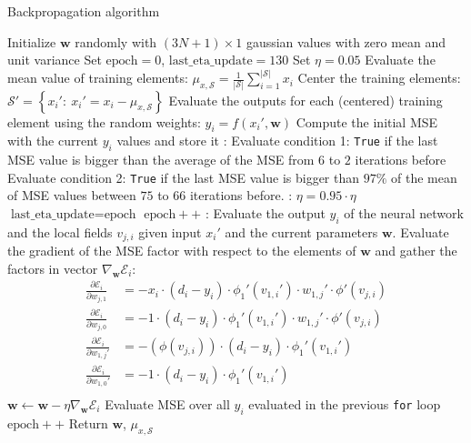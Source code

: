 \documentclass[12pt]{article}
\begin{document}
\begin{algorithm}
  \caption{Backpropagation algorithm}\label{alg:bp}
  \begin{algorithmic}[1]
    \State Initialize $\textbf{w}$ randomly with $(3N+1) \times 1$ gaussian values with zero mean and unit variance
    \State Set $\text{epoch} = 0$, $\text{last\_eta\_update} = 130$
    \State Set $\eta = 0.05$
    \State Evaluate the mean value of training elements: $\mu_{x,\mathcal{S}} = \frac{1}{|\mathcal{S}|}\sum_{i=1}^{|\mathcal{S}|}x_i$
    \State Center the training elements: $\mathcal{S}' = \left\{x_i' :\ x_i' = x_i - \mu_{x, \mathcal{S}}\right\}$
    \State Evaluate the outputs for each (centered) training element using the random weights: $y_i = f(x_i', \textbf{w})$
    \State Compute the initial MSE with the current $y_i$ values and store it %
    :
        \State Evaluate condition 1: \verb|True| if the last MSE value is bigger than the average of the MSE from $6$ to $2$ iterations before
        \State Evaluate condition 2: \verb|True| if the last MSE value is bigger than $97 \%$ of the mean of MSE values between $75$ to $66$ iterations before.
        :
          \State $\eta = 0.95\cdot \eta$
          \State $\text{last\_eta\_update} = \text{epoch}$
        \EndIf
      \EndIf
      \State $\text{epoch}++$
      :
        \State Evaluate the output $y_i$ of the neural network and the local fields $v_{j,i}$ given input $x_i'$ and the current parameters $\textbf{w}$.
        \State Evaluate the gradient of the MSE factor with respect to the elements of $\textbf{w}$ and gather the factors in vector $\nabla_{\textbf{w}} \mathcal{E}_i$:
        \begin{align*}
          \frac{\partial \mathcal{E}_i}{\partial w_{j,1}} &= - x_i\cdot (d_i - y_i)\cdot \phi_1'(v_{1,i}')\cdot w_{1,j}'\cdot \phi'(v_{j,i}) \\
          \frac{\partial \mathcal{E}_i}{\partial w_{j,0}} &= - 1\cdot (d_i - y_i)\cdot \phi_1'(v_{1,i}')\cdot w_{1,j}'\cdot \phi'(v_{j,i})\\
          \frac{\partial \mathcal{E}_i}{\partial w_{1, j}'} &= - (\phi(v_{j,i})) \cdot (d_i - y_i)\cdot \phi_1'(v_{1,i}') \\
          \frac{\partial \mathcal{E}_i}{\partial w_{1, 0}'} &= - 1 \cdot (d_i - y_i)\cdot \phi_1'(v_{1,i}') \\
        \end{align*}
        \State $\textbf{w} \leftarrow \textbf{w} - \eta \nabla_{\textbf{w}} \mathcal{E}_i$
      \EndFor
      \State Evaluate MSE over all $y_i$ evaluated in the previous \verb|for| loop
    \EndWhile
    \State $\text{epoch}++$
    \State Return $\textbf{w}$, $\mu_{x,\mathcal{S}}$
  \end{algorithmic}
\end{algorithm}
\end{document}
